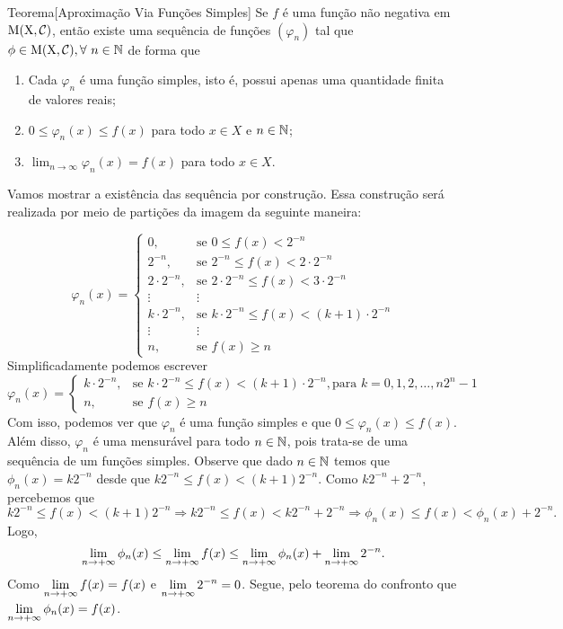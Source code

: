 \begin{env}{Teorema}[Aproximação Via Funções Simples]
	\label{teo:aproximação via funções simples}
	Se $f$ é uma função não negativa em $\operatorname{M(X, \mathcal{C} )}$, então existe uma sequência de funções $(\varphi_n)$ tal que $\phi \in \operatorname{M(X, \mathcal{C} )}, \forall \ n \in \operatorname{\mathbb{N}}$ de forma que
	\begin{enumerate}[label*=(\roman*)]
		\item Cada $\varphi_n$ é uma função simples, isto é, possui apenas uma quantidade finita de valores reais;
		\item $0 \leq \varphi_n(x) \leq f(x)$ para todo $x \in X$ e $n \in \operatorname{\mathbb{N}}$;
		\item $\displaystyle\lim_{n \to \infty} \varphi_n(x) = f(x)$ para todo $x \in X$.
	\end{enumerate}
\end{env} 

\begin{prova}
	Vamos mostrar a existência das sequência por construção.
	Essa construção será realizada por meio de partições da imagem da seguinte maneira:
	
	$$
	\varphi_n(x) =\left\{
	\begin{array}{ll}
		0, & \textrm{se\ } 0 \leq f(x) < 2^{-n} \\
		2^{-n}, & \textrm{se\ } 2^{-n} \leq f(x) < 2\cdot2^{-n} \\
		2\cdot2^{-n}, & \textrm{se\ } 2\cdot2^{-n} \leq f(x) < 3\cdot2^{-n} \\
		\vdots & \vdots \\
		k\cdot2^{-n}, & \textrm{se\ } k\cdot2^{-n} \leq f(x) < (k+1)\cdot2^{-n} \\
		\vdots & \vdots \\
		n, & \textrm{se\ } f(x) \geq n
	\end{array}
	\right.
	$$
	Simplificadamente podemos escrever
	$$
	\varphi_n(x) =\left\{
	\begin{array}{ll}
		k\cdot2^{-n}, & \textrm{se\ } k\cdot2^{-n} \leq f(x) < (k+1)\cdot2^{-n}, \textrm{para } k = 0,1,2, \ldots, n2^n-1 \\
		n, & \textrm{se\ } f(x) \geq n
	\end{array}
	\right.
	$$
	Com isso, podemos ver que $\varphi_n$ é uma função simples e que $0\leq \varphi_n(x)\leq f(x)$. Além disso, $\varphi_n$ é uma mensurável para todo $n \in \operatorname{\mathbb{N}}$, pois trata-se de uma sequência de um funções simples.
	Observe que dado $n \in \operatorname{\mathbb{N}}$ temos que
	$\phi_n(x) = k2^{-n}$ desde que 
	$k2^{-n} \leq f(x) < (k+1)2^{-n}$.
	Como  $k2^{-n}+2^{-n}$, percebemos que
	$$
	k2^{-n} \leq f(x) < (k+1)2^{-n}
	\Rightarrow
	k2^{-n} \leq f(x) < k2^{-n} + 2^{-n}
	\Rightarrow
	\phi_n(x) \leq f(x) < \phi_n(x) + 2^{-n}.
	$$
	Logo, 
	$$
	\displaystyle \lim_{n \to +\infty}\phi_n(x)  
	\leq 
	\displaystyle \lim_{n \to +\infty}f(x) 
	\leq 
	\displaystyle \lim_{n \to +\infty}\phi_n(x) 
	+ 
	\displaystyle \lim_{n \to +\infty}2^{-n}.
	$$
	Como $\displaystyle \lim_{n \to +\infty} f(x) = f(x)$ e 
	$\displaystyle \lim_{n \to +\infty} 2^{-n} = 0$.
	Segue, pelo teorema do confronto que
	$\displaystyle \lim_{n \to +\infty} \phi_n(x) = f(x)$.
\end{prova}

